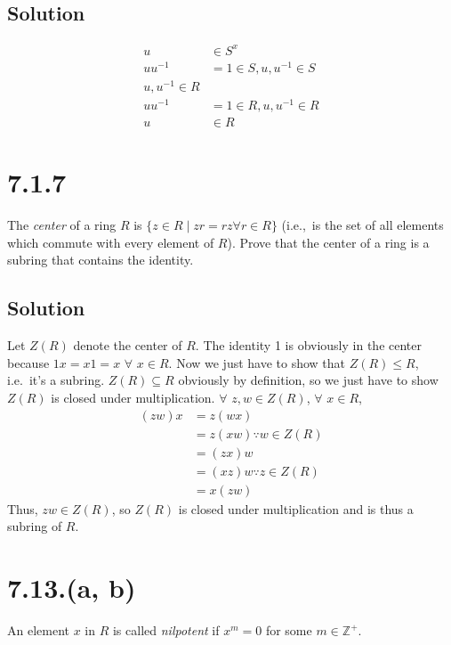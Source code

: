 \documentclass[fleqn]{article}
\begin{document}
        \subsection{Solution}
        \begin{align}
            u &\in S^x \\
            u u^{-1} &= 1 \in S, u, u^{-1} \in S \\
            u, u^{-1} \in R \\
            u u^{-1} &= 1 \in R, u, u^{-1} \in R \\
            u &\in R
        \end{align}
    
    \section{7.1.7}
    The \textit{center} of a ring $R$ is $\{z \in R \mid zr = rz \forall r \in R\}$ (i.e.,\ is the set of all elements which commute with every element of $R$).  Prove that the center of a ring is a subring that contains the identity.
        
        \subsection{Solution}
        Let $Z(R)$ denote the center of $R$.  The identity 1 is obviously in the center because $1x = x1 = x$ $\forall$ $x \in R$.  Now we just have to show that $Z(R) \leq R$, i.e.\ it's a subring.  $Z(R) \subseteq R$ obviously by definition, so we just have to show $Z(R)$ is closed under multiplication.  $\forall$ $z, w \in Z(R)$, $\forall$ $x \in R$,
        \begin{align}
            (zw)x &= z(wx) \\
                &= z(xw) \because{} w \in Z(R) \\
                &= (zx)w \\
                &= (xz)w \because{} z \in Z(R) \\
                &= x(zw)
        \end{align}
        Thus, $zw \in Z(R)$, so $Z(R)$ is closed under multiplication and is thus a subring of $R$.
    
    \section{7.13.(a, b)}
    An element $x$ in $R$ is called \textit{nilpotent} if $x^m = 0$ for some $m \in \mathbb{Z}^+$.
        
\end{document}
